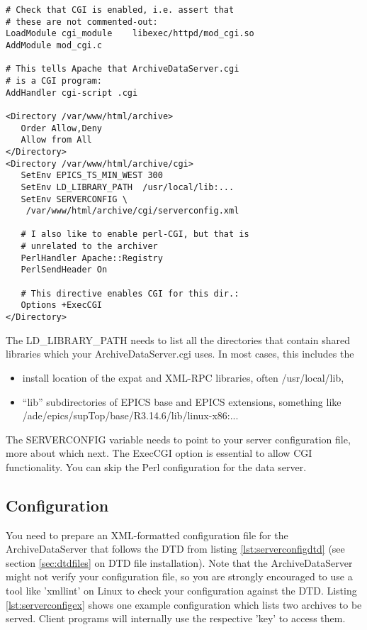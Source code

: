 \begin{enumerate}
\begin{lstlisting}[keywordstyle=\sffamily]
# Check that CGI is enabled, i.e. assert that
# these are not commented-out:
LoadModule cgi_module    libexec/httpd/mod_cgi.so
AddModule mod_cgi.c

# This tells Apache that ArchiveDataServer.cgi
# is a CGI program:
AddHandler cgi-script .cgi

<Directory /var/www/html/archive>
   Order Allow,Deny
   Allow from All
</Directory>
<Directory /var/www/html/archive/cgi>
   SetEnv EPICS_TS_MIN_WEST 300
   SetEnv LD_LIBRARY_PATH  /usr/local/lib:...
   SetEnv SERVERCONFIG \
    /var/www/html/archive/cgi/serverconfig.xml

   # I also like to enable perl-CGI, but that is
   # unrelated to the archiver
   PerlHandler Apache::Registry
   PerlSendHeader On

   # This directive enables CGI for this dir.:
   Options +ExecCGI
</Directory>
\end{lstlisting}
  The LD\_LIBRARY\_PATH needs to list all the directories that
  contain shared libraries which your ArchiveDataServer.cgi uses.
  In most cases, this includes the
  \begin{itemize}
  \item install location of the expat and XML-RPC
        libraries, often /usr/local/lib,
  \item ``lib'' subdirectories of EPICS base and EPICS extensions,
        something like /ade/epics/supTop/base/R3.14.6/lib/linux-x86:...
  \end{itemize}
  The SERVERCONFIG variable needs to point to your server configuration
  file, more about which next. The ExecCGI option is essential to
  allow CGI functionality. You can skip the Perl configuration for the
  data server.
\end{enumerate}

\subsection{Configuration}  %
You need to prepare an XML-formatted configuration file for the
ArchiveDataServer that follows the DTD from listing
\ref{lst:serverconfigdtd} (see section \ref{sec:dtdfiles} on DTD file
installation). Note that the ArchiveDataServer might not verify your
configuration file, so you are strongly encouraged to use a tool like
'xmllint' on Linux to check your configuration against the
DTD. Listing \ref{lst:serverconfigex} shows one example configuration
which lists two archives to be served. Client programs will internally
use the respective 'key' to access them.

